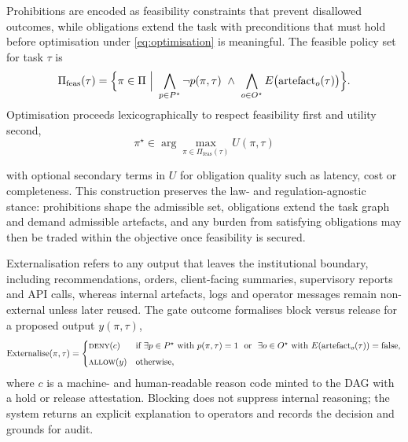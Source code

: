 \documentclass[oneside,10pt]{swissi}
\begin{document}
Prohibitions are encoded as feasibility constraints that prevent disallowed outcomes, while obligations extend the task with preconditions that must hold before optimisation under \eqref{eq:optimisation} is meaningful. The feasible policy set for task \(\tau\) is
\begin{equation}
\Pi_{\mathrm{feas}}(\tau)=\Bigl\{\pi\in\Pi \ \Big|\ \bigwedge_{p\in P^{\star}} \neg p(\pi,\tau)\ \wedge\ \bigwedge_{o\in O^{\star}} E\bigl(\mathrm{artefact}_o(\tau)\bigr)\Bigr\}.
\label{eq:feasible}
\end{equation}
Optimisation proceeds lexicographically to respect feasibility first and utility second,
\begin{equation}
\pi^\star \in \arg\max_{\pi\in\Pi_{\mathrm{feas}}(\tau)} U(\pi,\tau)
\label{eq:lexi}
\end{equation}

with optional secondary terms in \(U\) for obligation quality such as latency, cost or completeness. This construction preserves the law- and regulation-agnostic stance: prohibitions shape the admissible set, obligations extend the task graph and demand admissible artefacts, and any burden from satisfying obligations may then be traded within the objective once feasibility is secured.

Externalisation refers to any output that leaves the institutional boundary, including recommendations, orders, client-facing summaries, supervisory reports and API calls, whereas internal artefacts, logs and operator messages remain non-external unless later reused. The gate outcome formalises block versus release for a proposed output \(y(\pi,\tau)\),
\begin{equation}
\mathrm{Externalise}(\pi,\tau)=
\begin{cases}
\textsc{deny}(c) & \text{if }\exists p\in P^{\star}\text{ with }p(\pi,\tau)=1\ \ \text{or}\ \ \exists o\in O^{\star}\text{ with }E(\mathrm{artefact}_o(\tau))=\text{false},\\[4pt]
\textsc{allow}(y) & \text{otherwise,}
\end{cases}
\label{eq:externalise}
\end{equation}
where \(c\) is a machine- and human-readable reason code minted to the DAG with a hold or release attestation. Blocking does not suppress internal reasoning; the system returns an explicit explanation to operators and records the decision and grounds for audit.
\end{document}
